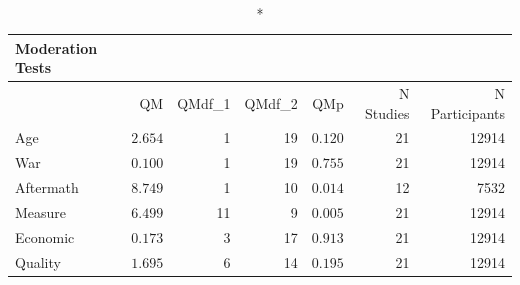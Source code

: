 \documentclass[
  letterpaper,
  DIV=11,
  numbers=noendperiod]{scrartcl}
\begin{document}
\begin{longtable*}{l|rrrrrr}
\caption*{
{\large Moderation Tests}
} \\ 
\toprule
{} & QM & QMdf\_1 & QMdf\_2 & QMp & N Studies & N Participants \\ 
\midrule\addlinespace[2.5pt]
Age & $2.654$ & 1 & 19 & $0.120$ & 21 & 12914 \\ 
War & $0.100$ & 1 & 19 & $0.755$ & 21 & 12914 \\ 
Aftermath & $8.749$ & 1 & 10 & $0.014$ & 12 & 7532 \\ 
Measure & $6.499$ & 11 & 9 & $0.005$ & 21 & 12914 \\ 
Economic & $0.173$ & 3 & 17 & $0.913$ & 21 & 12914 \\ 
Quality & $1.695$ & 6 & 14 & $0.195$ & 21 & 12914 \\ 
\bottomrule
\end{longtable*}
\end{document}
